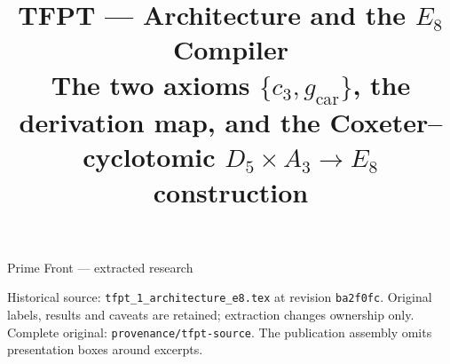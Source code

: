 \documentclass[11pt,a4paper]{article}
\title{\vspace{-1.2cm}\textbf{TFPT --- Architecture and the $E_8$ Compiler}\\[2mm]\large The two axioms $\{c_3,g_{\mathrm{car}}\}$, the derivation map, and the Coxeter--cyclotomic $D_5\times A_3\to E_8$ construction}
\author{\TFPTauthors}\date{\TFPTdatestamp}
\theoremstyle{definition}
\begin{document}
\begin{center}\Large Prime Front --- extracted research\end{center}
\noindent Historical source: \texttt{tfpt\_1\_architecture\_e8.tex} at revision \texttt{ba2f0fc}. Original labels, results and caveats are retained; extraction changes ownership only. Complete original: \texttt{provenance/tfpt-source}. The publication assembly omits presentation boxes around excerpts.
\tableofcontents
\clearpage

\end{document}
